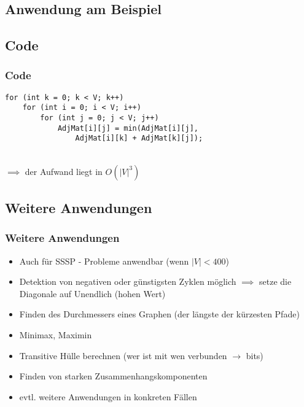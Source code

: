 
\subsection{Anwendung am Beispiel}



\subsection{Code}

\begin{frame}[fragile] %
\frametitle{Code}

\begin{lstlisting}
for (int k = 0; k < V; k++)
    for (int i = 0; i < V; i++)
        for (int j = 0; j < V; j++)
            AdjMat[i][j] = min(AdjMat[i][j],
                AdjMat[i][k] + AdjMat[k][j]);
\end{lstlisting}

~\\$\implies$ der Aufwand liegt in $O(|V|^3)$

\end{frame}


\subsection{Weitere Anwendungen} 

\begin{frame}
\frametitle{Weitere Anwendungen}
\begin{itemize}

\item Auch für SSSP - Probleme anwendbar (wenn $\vert V \vert < 400$)
\item Detektion von negativen oder günstigsten Zyklen möglich $\implies$ setze die Diagonale auf Unendlich (hohen Wert)
\item Finden des Durchmessers eines Graphen (der längste der kürzesten Pfade)
\item Minimax, Maximin
\item Transitive Hülle berechnen (wer ist mit wen verbunden $\rightarrow$ bits)
\item Finden von starken Zusammenhangskomponenten
\item evtl. weitere Anwendungen in konkreten Fällen
\end{itemize}
\end{frame}

